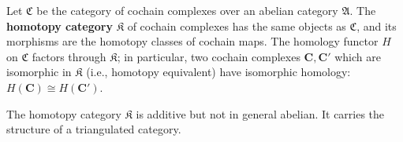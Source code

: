Let $\mathfrak{C}$ be the category of cochain complexes over an abelian category $\mathfrak{A}$. The \textbf{homotopy category} $\mathfrak{K}$ of cochain complexes has the same objects as $\mathfrak{C}$, and its morphisms are the homotopy classes of cochain maps. The homology functor $H$ on $\mathfrak{C}$ factors through $\mathfrak{K}$; in particular, two cochain complexes $\mathbf{C}, \mathbf{C}'$ which are isomorphic in $\mathfrak{K}$ (i.e., homotopy equivalent) have isomorphic homology: $H(\mathbf{C}) \cong H(\mathbf{C}')$.

The homotopy category $\mathfrak{K}$ is additive but not in general abelian. It carries the structure of a triangulated category.
